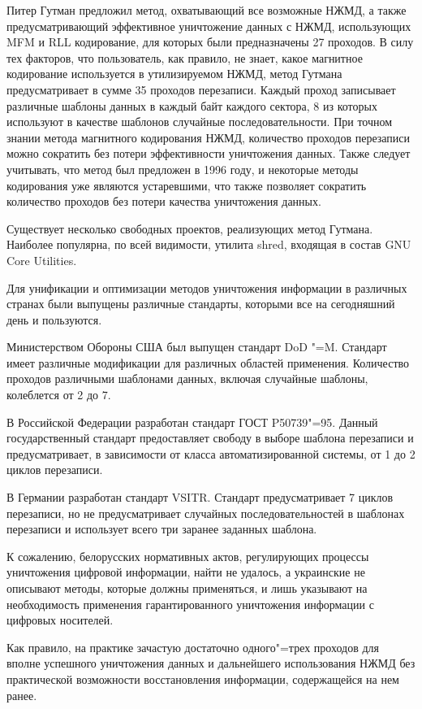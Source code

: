 \documentclass[10pt, a5paper]{article}
\begin{document}
Питер Гутман предложил метод, охватывающий все возможные НЖМД, а также предусматривающий эффективное уничтожение данных с НЖМД, использующих MFM и RLL кодирование, для которых были предназначены 27 проходов. В силу тех факторов, что пользователь, как правило, не знает, какое магнитное кодирование используется в утилизируемом НЖМД, метод Гутмана предусматривает в сумме 35 проходов перезаписи. Каждый проход записывает различные шаблоны данных в каждый байт каждого сектора, 8 из которых используют в качестве шаблонов случайные последовательности. При точном знании метода магнитного кодирования НЖМД, количество проходов перезаписи можно сократить без потери эффективности уничтожения данных. Также следует учитывать, что метод был предложен в 1996 году, и некоторые методы кодирования уже являются устаревшими, что также позволяет сократить количество проходов без потери качества уничтожения данных.

Существует несколько свободных проектов, реализующих метод Гутмана. Наиболее популярна, по всей видимости, утилита  shred, входящая в состав GNU Core Utilities.

Для унификации и оптимизации методов уничтожения информации в различных странах были выпущены различные стандарты, которыми все на сегодняшний день и пользуются.

Министерством Обороны США был выпущен стандарт DoD "=M. Стандарт имеет различные модификации для различных областей применения. Количество проходов различными шаблонами данных, включая случайные шаблоны, колеблется от 2 до 7.

В Российской Федерации разработан стандарт ГОСТ P50739"=95. Данный государственный стандарт предоставляет свободу в выборе шаблона перезаписи и предусматривает, в зависимости от класса автоматизированной системы, от 1 до 2 циклов перезаписи.

В Германии разработан стандарт VSITR. Стандарт предусматривает 7 циклов перезаписи, но не предусматривает случайных последовательностей в шаблонах перезаписи и использует всего три заранее заданных шаблона.

К сожалению, белорусских нормативных актов, регулирующих процессы уничтожения цифровой информации, найти не удалось, а украинские не описывают методы, которые должны применяться, и лишь указывают на необходимость применения гарантированного уничтожения информации с цифровых носителей.

Как правило, на практике зачастую достаточно одного"=трех проходов для вполне успешного уничтожения данных и дальнейшего использования НЖМД без практической возможности восстановления информации, содержащейся на нем ранее.
\end{document}
